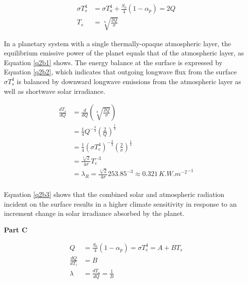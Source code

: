 \documentclass[12pt]{article}
\begin{document}
\begin{equation}\label{q2b2}
    \begin{split}
        \sigma T_s^4 &= \sigma T_a^4 + \frac{S_0}{4}(1-\alpha_p) = 2Q \\
        T_s &= \sqrt[4]{\frac{2Q}{\sigma}}
    \end{split}
\end{equation}

In a planetary system with a single thermally-opaque atmospheric layer, the equilibrium emissive power of the planet equals that of the atmospheric layer, as Equation \ref{q2b1} shows. The energy balance at the surface is expressed by Equation \ref{q2b2}, which indicates that outgoing longwave flux from the surface $\sigma T_s^4$ is balanced by downward longwave emissions from the atmospheric layer as well as shortwave solar irradiance.

\begin{equation}\label{q2b3}
    \begin{split}
        \frac{dT_s}{dQ} &= \frac{d}{dQ}\left(\sqrt[4]{\frac{2Q}{\sigma}}\right) \\
        &= \frac{1}{4} Q^{-\frac{3}{4}} \left(\frac{2}{Q}\right)^{\frac{1}{4}} \\
        &= \frac{1}{4} (\sigma T_e^4)^{-\frac{3}{4}} \left(\frac{2}{\sigma}\right)^{\frac{1}{4}} \\
        &= \frac{\sqrt[4]{2}}{4\sigma}T_e^{-3} \\
        &= \lambda_R = \frac{\sqrt[4]{2}}{4\sigma}253.85^{-3} \approx 0.321\,\si{K.{W.m^{-2}}^{-1}} \\
    \end{split}
\end{equation}

Equation \ref{q2b3} shows that the combined solar and atmospheric radiation incident on the surface results in a higher climate sensitivity in response to an increment change in solar irradiance absorbed by the planet.

\vspace{2em}\noindent\textbf{Part C}

\begin{equation}\label{q2b4}
    \begin{split}
        Q &= \frac{S_0}{4}(1-\alpha_p) = \sigma T_e^4 = A+BT_s \\
        \frac{dQ}{dT_s} &= B \\
        \lambda &= \frac{dT_s}{dQ} = \frac{1}{B} \\
    \end{split}
\end{equation}
\end{document}
